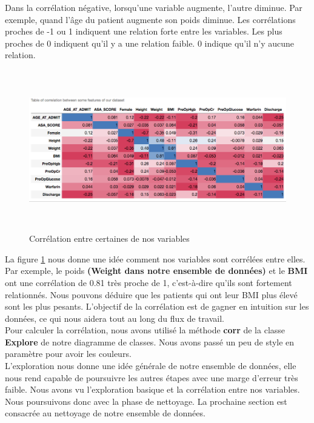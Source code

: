 \documentclass[12pt, french]{report}
\begin{document}
Dans la corrélation négative, lorsqu'une variable augmente, l'autre diminue. Par exemple, quand l'âge du patient augmente son poids diminue. Les corrélations proches de -1 ou 1 indiquent une relation forte entre les variables. Les plus proches de 0 indiquent qu'il y a une relation faible. 0 indique qu'il n'y aucune relation.

\begin{figure}[h]
	\begin{center}
		\includegraphics[width=19cm, height =7cm,angle=90]{images/correlation.png}
		\caption{Corrélation entre certaines de nos variables}
		\label{fig:correlation}
	\end{center}
\end{figure}

La figure \ref{fig:correlation} nous donne une idée comment nos variables sont corrélées entre elles. Par exemple, le poids \textbf{ (Weight dans notre ensemble de données)} et le \textbf{BMI} ont une corrélation de 0.81 très proche de 1, c'est-à-dire qu'ils sont fortement relationnés. Nous pouvons déduire que les patients qui ont leur BMI plus élevé sont les plus pesants. L'objectif de la corrélation est de gagner en intuition sur les données, ce qui nous aidera tout au long du flux de travail.\\ 

Pour calculer la corrélation, nous avons utilisé la méthode \textbf{corr} de  la classe \textbf{Explore} de notre diagramme de classes. Nous avons passé un peu de style en paramètre pour avoir les couleurs.  \\

L'exploration nous donne une idée générale de notre ensemble de données, elle nous rend capable de poursuivre les autres étapes avec une marge d'erreur très faible. Nous avons vu l'exploration basique et la corrélation entre nos variables. Nous poursuivons donc avec la phase de nettoyage. La prochaine section est consacrée au nettoyage de notre ensemble de données.
\end{document}
